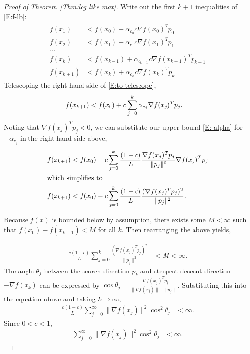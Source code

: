 \begin{proof}[Proof of Theorem~\ref{Thm:log like max}]
Write out the first $k+1$ inequalities of \eqref{E:f-lb}:
\begin{align}
\begin{split}
	f( x_1 ) &< f(x_0) + \alpha_{c_0} c \nabla f(x_0)^T p_0 \\
	f( x_2 ) &< f(x_1) + \alpha_{c_1} c \nabla f(x_1)^T p_1  \\
	\ldots  \\
	f( x_{k} ) &< f(x_{k-1}) + \alpha_{c_{k-1}} c \nabla f(x_{k-1})^T p_{k-1}  \\
	f( x_{k+1} ) &< f(x_k) + \alpha_{c_k} c \nabla f(x_k)^T p_k 
\end{split}
	\label{E:to telescope}
\end{align}
Telescoping the right-hand side of \eqref{E:to telescope},
\begin{align*}
	f( x_{k+1} ) &< f(x_0) + c \sum_{j=0}^{k} \alpha_{c_j} \nabla f(x_j)^T p_j. \notag
\end{align*}
Noting that $\nabla f(x_j)^T p_j < 0$, we can substitute our upper bound 
\eqref{E:-alpha} for $-\alpha_{c_j}$ in the right-hand side above,
\begin{align}
	f( x_{k+1} ) &< f(x_0) - c \sum_{j=0}^{k} \frac{( 1 - c )}{L} 
	\frac{\nabla f(x_j)^T p_j}{ \lVert p_j \rVert^2 } \nabla f(x_j)^T p_j \notag \\
	\intertext{which simplifies to}
	f( x_{k+1} ) &< f(x_0) - c \sum_{j=0}^{k} \frac{( 1 - c )}{L} 
	\frac{ (\nabla f(x_j)^T p_j)^2}{ \lVert p_j \rVert ^2 }. 
\notag
\end{align}

Because $f(x)$ is bounded below by assumption, there exists some $M < \infty$ such 
that $f(x_0) - f(x_{k+1}) < M$ for 
all $k$. Then rearranging the above yields,

\begin{align*}
	\frac{c( 1 - c )}{L} \sum_{j=0}^{k}   
	\frac{ ( \nabla f(x_j)^T p_j )^2}{ \lVert p_j \rVert ^2 } &< M < \infty.
 \end{align*}
The angle $\theta_j$ between the search direction $p_k$ and steepest descent direction 
$-\nabla f(x_k)$ can be expressed 
by $\cos \theta_j = \frac{ -\nabla f(x_j)^T p_j}{\lVert \nabla f(x_j)\rVert \cdot \lVert p_j \rVert}$.  
Substituting this into the equation 
above and taking $k \to \infty$,
\begin{align*}
	\frac{c( 1 - c )}{L} \sum_{j=0}^{\infty}  \lVert \nabla f(x_j)\rVert^2 \cos^2 \theta_j  &< \infty.
\end{align*}
Since $0 < c < 1$,
\begin{align}
	\sum_{j=0}^{\infty}  \lVert \nabla f(x_j) \rVert ^2 \cos^2 \theta_j  &< \infty. \label{E:Z's}
\end{align}


\end{proof}
